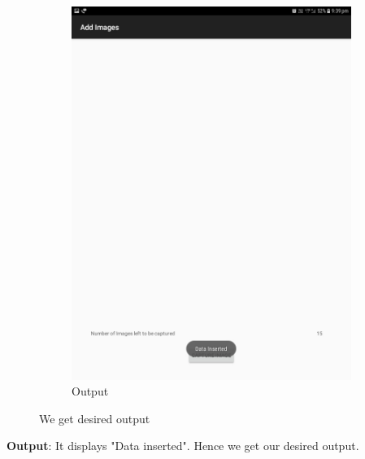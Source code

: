 \documentclass{scrreprt}
\begin{document}
\begin{itemize}
\begin{enumerate}
\begin{figure}[H]
\begin{subfigure}{0.5\textwidth}
\includegraphics[width=0.85\linewidth, keepaspectratio]{added.jpg}
\caption{Output}
\label{fig:subim2}
\end{subfigure}
\caption{We get desired output}
\end{figure}
\textbf{Output}: It displays "Data inserted". Hence we get our desired output.

\end{enumerate}
\end{itemize}
\end{document}
